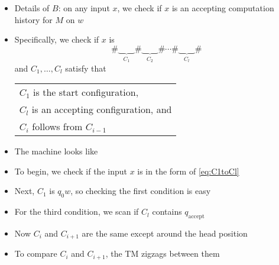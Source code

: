 \begin{frame}[allowframebreaks]
\begin{itemize}
\item Details of $B$: on any input $x$, we check if $x$ is an
  accepting computation history for $M$ on $w$
\item Specifically, we check if $x$ is
  \begin{equation}
    \#\underbrace{\qquad}_{C_1}\#\underbrace{\qquad}_{C_2}\#\cdots\#\underbrace{\qquad}_{C_l}\#
    \label{eq:C1toCl}
  \end{equation}
  and $C_1, \ldots, C_l$ satisfy that
  \begin{center}
  \begin{tabular}{l}
    $C_1$  is the start configuration,\\
    $C_l$ is an accepting configuration, and\\
    $C_i$ follows from $C_{i-1}$
  \end{tabular}
\end{center}
\item The machine looks like
  \begin{center}
\end{center}
\item To begin, we check if the input $x$ is in the form of
  \eqref{eq:C1toCl}
\item Next, $C_1$ is $q_0 w$, so checking the first condition is
  easy
\item For the third condition, we scan if $C_l$ contains $q_{\text{accept}}$
\item Now $C_i$ and $C_{i+1}$ are the same except around the
  head position
\item To compare $C_i$ and $C_{i+1}$, the TM zigzags between
  them


\end{itemize}
\end{frame}
